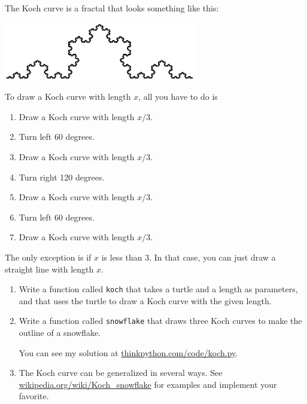 \documentclass[10pt]{book}
\begin{document}
\begin{ex}


The Koch curve is a fractal that looks something like
this:

\beforefig
\centerline{\includegraphics[height=1in]{figs/koch.eps}}
\afterfig

To draw a Koch curve with length $x$, all you have to do is

\begin{enumerate}

\item Draw a Koch curve with length $x/3$.

\item Turn left 60 degrees.

\item Draw a Koch curve with length $x/3$.

\item Turn right 120 degrees.

\item Draw a Koch curve with length $x/3$.

\item Turn left 60 degrees.

\item Draw a Koch curve with length $x/3$.

\end{enumerate}

The only exception is if $x$ is less than 3.  In that case,
you can just draw a straight line with length $x$.

\begin{enumerate}

\item Write a function called {\tt koch} that takes a turtle and
a length as parameters, and that uses the turtle to draw a Koch
curve with the given length.

\item Write a function called {\tt snowflake} that draws three
Koch curves to make the outline of a snowflake.

You can see my solution at \url{thinkpython.com/code/koch.py}.

\item The Koch curve can be generalized in several ways.  See
\url{wikipedia.org/wiki/Koch_snowflake} for examples and
implement your favorite.

\end{enumerate}
\end{ex}
\end{document}

